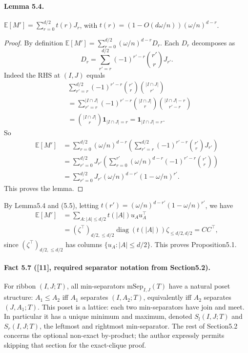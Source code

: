 \documentclass[10pt,a4paper]{article}
\begin{document}
\paragraph{Lemma 5.4.} $\mathbb E[M']=\sum_{r=0}^{d/2}t(r)J_r$, with $t(r)=(1-O(d\omega/n))(\omega/n)^{d-r}$.
\begin{proof}By definition $\mathbb E[M']=\sum_{r=0}^{d/2}(\omega/n)^{d-r}D_r$. Each $D_r$ decomposes as
\[D_r=\sum_{r'=r}^{d/2}(-1)^{r'-r}\binom{r'}rJ_{r'}.\tag{5.6}\]
Indeed the RHS at $(I,J)$ equals
\begin{align*}&\sum_{r'=r}^{d/2}(-1)^{r'-r}\binom{r'}r\binom{|I\cap J|}{r'}\\&=\sum_{r'=r}^{|I\cap J|}(-1)^{r'-r}\binom{|I\cap J|}r\binom{|I\cap J|-r}{r'-r}\\&=\binom{|I\cap J|}r\mathbf1_{|I\cap J|=r}=\mathbf1_{|I\cap J|=r}.\end{align*}
So
\begin{align*}\mathbb E[M']&=\sum_{r=0}^{d/2}(\omega/n)^{d-r}\left(\sum_{r'=r}^{d/2}(-1)^{r'-r}\binom{r'}rJ_{r'}\right)\\&=\sum_{r'=0}^{d/2}J_{r'}\left(\sum_{r=0}^{r'}(\omega/n)^{d-r}(-1)^{r'-r}\binom{r'}r\right)\\&=\sum_{r'=0}^{d/2}J_{r'}(\omega/n)^{d-r'}(1-\omega/n)^{r'}.\tag{5.7}\end{align*}
This proves the lemma.\end{proof}
By Lemma5.4 and (5.5), letting $t(r')=(\omega/n)^{d-r'}(1-\omega/n)^{r'}$, we have
\begin{align*}\mathbb E[M']&=\sum_{A:|A|\le d/2}t(|A|)u_Au_A^\top\\&=(\zeta^\top)_{d/2,\le d/2}\operatorname{diag}(t(|A|))\zeta_{\le d/2,d/2}=CC^\top,\end{align*}
since $(\zeta^\top)_{d/2,\le d/2}$ has columns $\{u_A:|A|\le d/2\}$. This proves Proposition5.1.
\paragraph{Fact 5.7 ([11], required separator notation from Section5.2).} For ribbon $(I,J;T)$, all min-separators $\mathrm{mSep}_{I,J}(T)$ have a natural poset structure: $A_1\le A_2$ iff $A_1$ separates $(I,A_2;T)$, equivalently iff $A_2$ separates $(J,A_1;T)$. This poset is a lattice: each two min-separators have join and meet. In particular it has a unique minimum and maximum, denoted $S_l(I,J;T)$ and $S_r(I,J;T)$, the leftmost and rightmost min-separator. The rest of Section5.2 concerns the optional non-exact by-product; the author expressly permits skipping that section for the exact-clique proof.
\end{document}
